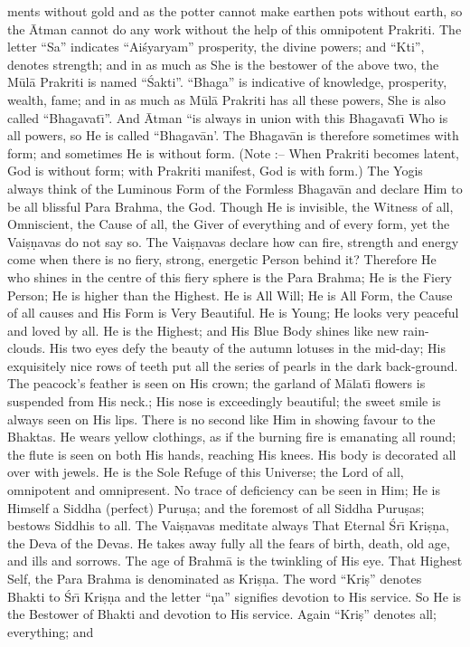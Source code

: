 ments without gold and as the potter cannot make earthen pots without earth, so the \=Atman cannot do any work without the help of this omnipotent Prakriti. The letter ``Sa'' indicates ``Ai\'syaryam'' prosperity, the divine powers; and ``Kti'', denotes strength; and in as much as She is the bestower of the above two, the M\=ul\=a Prakriti is named ``\'Sakti''. ``Bhaga'' is indicative of knowledge, prosperity, wealth, fame; and in as much as M\=ul\=a Prakriti has all these powers, She is also called ``Bhagavat\={\i}''. And \=Atman ``is always in union with this Bhagavat\={\i} Who is all powers, so He is called ``Bhagav\=an'. The Bhagav\=an is therefore sometimes with form; and sometimes He is without form. (Note :-- When Prakriti becomes latent, God is without form; with Prakriti manifest, God is with form.) The Yogis always think of the Luminous Form of the Formless Bhagav\=an and declare Him to be all blissful Para Brahma, the God. Though He is invisible, the Witness of all, Omniscient, the Cause of all, the Giver of everything and of every form, yet the Vai\d{s}\d{n}avas do not say so. The Vai\d{s}\d{n}avas declare how can fire, strength and energy come when there is no fiery, strong, energetic Person behind it? Therefore He who shines in the centre of this fiery sphere is the Para Brahma; He is the Fiery Person; He is higher than the Highest. He is All Will; He is All Form, the Cause of all causes and His Form is Very Beautiful. He is Young; He looks very peaceful and loved by all. He is the Highest; and His Blue Body shines like new rain-clouds. His two eyes defy the beauty of the autumn lotuses in the mid-day; His exquisitely nice rows of teeth put all the series of pearls in the dark back-ground. The peacock's feather is seen on His crown; the garland of M\=alat\={\i} flowers is suspended from His neck.; His nose is exceedingly beautiful; the sweet smile is always seen on His lips. There is no second like Him in showing favour to the Bhaktas. He wears yellow clothings, as if the burning fire is emanating all round; the flute is seen on both His hands, reaching His knees. His body is decorated all over with jewels. He is the Sole Refuge of this Universe; the Lord of all, omnipotent and omnipresent. No trace of deficiency can be seen in Him; He is Himself a Siddha (perfect) Puru\d{s}a; and the foremost of all Siddha Puru\d{s}as; bestows Siddhis to all. The Vai\d{s}\d{n}avas meditate always That Eternal \'Sr\={\i} Kri\d{s}\d{n}a, the Deva of the Devas. He takes away fully all the fears of birth, death, old age, and ills and sorrows. The age of Brahm\=a is the twinkling of His eye. That Highest Self, the Para Brahma is denominated as Kri\d{s}\d{n}a. The word ``Kri\d{s}'' denotes Bhakti to \'Sr\={\i} Kri\d{s}\d{n}a and the letter ``\d{n}a'' signifies devotion to His service. So He is the Bestower of Bhakti and devotion to His service. Again ``Kri\d{s}'' denotes all; everything; and

